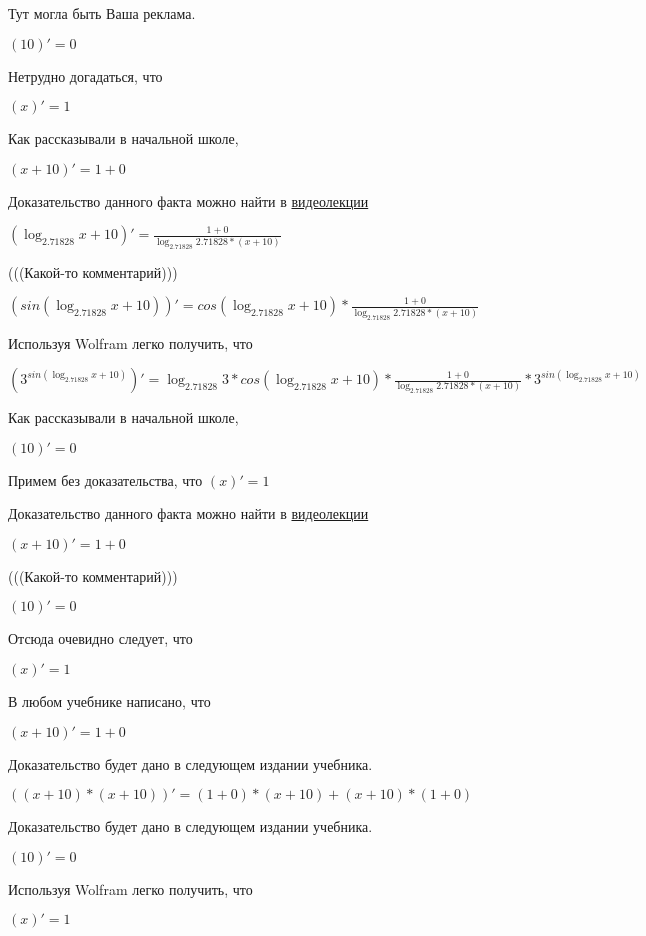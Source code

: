\documentclass[12pt,a4paper,fleqn]{article}
\theoremstyle{definition}
\begin{document}
Тут могла быть Ваша реклама.

$( 10 )' =  0 $

Нетрудно догадаться, что

$( x )' =  1 $

Как рассказывали в начальной школе,

$( x  +  10 )' =  1  +  0 $

Доказательство данного факта можно найти в \href{https://www.youtube.com/watch?v=dQw4w9WgXcQ}{видеолекции}

$(\log_{ 2.71828 }{ x  +  10 })' = \frac{ 1  +  0 }{\log_{ 2.71828 }{ 2.71828 } * ( x  +  10 )}
$

(((Какой-то комментарий)))

$(sin(\log_{ 2.71828 }{ x  +  10 }))' = cos(\log_{ 2.71828 }{ x  +  10 }) * \frac{ 1  +  0 }{\log_{ 2.71828 }{ 2.71828 } * ( x  +  10 )}
$

Используя Wolfram легко получить, что

$({ 3 }^{sin(\log_{ 2.71828 }{ x  +  10 })})' = \log_{ 2.71828 }{ 3 } * cos(\log_{ 2.71828 }{ x  +  10 }) * \frac{ 1  +  0 }{\log_{ 2.71828 }{ 2.71828 } * ( x  +  10 )}
 * { 3 }^{sin(\log_{ 2.71828 }{ x  +  10 })}$

Как рассказывали в начальной школе,

$( 10 )' =  0 $

Примем без доказательства, что
$( x )' =  1 $

Доказательство данного факта можно найти в \href{https://www.youtube.com/watch?v=dQw4w9WgXcQ}{видеолекции}

$( x  +  10 )' =  1  +  0 $

(((Какой-то комментарий)))

$( 10 )' =  0 $

Отсюда очевидно следует, что

$( x )' =  1 $

В любом учебнике написано, что

$( x  +  10 )' =  1  +  0 $

Доказательство будет дано в следующем издании учебника.

$(( x  +  10 ) * ( x  +  10 ))' = ( 1  +  0 ) * ( x  +  10 ) + ( x  +  10 ) * ( 1  +  0 )$

Доказательство будет дано в следующем издании учебника.

$( 10 )' =  0 $

Используя Wolfram легко получить, что

$( x )' =  1 $
\end{document}
